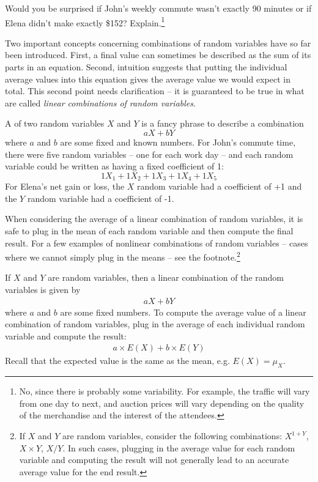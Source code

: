 \begin{exercise} \label{explainWhyThereIsUncertaintyInTheSum}
Would you be surprised if John's weekly commute wasn't exactly 90 minutes or if Elena didn't make exactly \$152? Explain.\footnote{No, since there is probably some variability. For example, the traffic will vary from one day to next, and auction prices will vary depending on the quality of the merchandise and the interest of the attendees.}
\end{exercise}

Two important concepts concerning combinations of random variables have so far been introduced. First, a final value can sometimes be described as the sum of its parts in an equation. Second, intuition suggests that putting the individual average values into this equation gives the average value we would expect in total. This second point needs clarification -- it is guaranteed to be true in what are called \emph{linear combinations of random variables}.

A  of two random variables $X$ and $Y$ is a fancy phrase to describe a combination
$$ aX + bY$$
where $a$ and $b$ are some fixed and known numbers. For John's commute time, there were five random variables -- one for each work day -- and each random variable could be written as having a fixed coefficient of 1:
$$ 1X_1 + 1 X_2 + 1 X_3 + 1 X_4 + 1 X_5 $$
For Elena's net gain or loss, the $X$ random variable had a coefficient of +1 and the $Y$ random variable had a coefficient of -1.

When considering the average of a linear combination of random variables, it is safe to plug in the mean of each random variable and then compute the final result. For a few examples of nonlinear combinations of random variables -- cases where we cannot simply plug in the means -- see the footnote.\footnote{If $X$ and $Y$ are random variables, consider the following combinations: $X^{1+Y}$, $X\times Y$, $X/Y$. In such cases, plugging in the average value for each random variable and computing the result will not generally lead to an accurate average value for the end result.}

\begin{termBox}{
If $X$ and $Y$ are random variables, then a linear combination of the random variables is given by
\begin{align}\label{linComboOfRandomVariablesXAndY}
aX + bY
\end{align}
where $a$ and $b$ are some fixed numbers. To compute the average value of a linear combination of random variables, plug in the average of each individual random variable and compute the result:
\begin{align*}
a\times E(X) + b\times E(Y)
\end{align*}
Recall that the expected value is the same as the mean, e.g. $E(X) = \mu_X$.}
\end{termBox}

